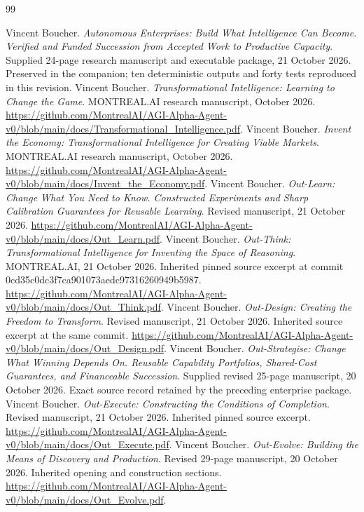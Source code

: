 \documentclass[11pt,letterpaper]{article}
\theoremstyle{definition}\newtheorem{definition}[theorem]{Definition}
\theoremstyle{remark}\newtheorem{remark}[theorem]{Remark}
\begin{document}
\begin{thebibliography}{99}
\small\raggedright\setlength{\itemsep}{.22em}
 Vincent Boucher. \emph{Autonomous Enterprises: Build What Intelligence Can Become. Verified and Funded Succession from Accepted Work to Productive Capacity}. Supplied 24-page research manuscript and executable package, 21 October 2026. Preserved in the companion; ten deterministic outputs and forty tests reproduced in this revision.
 Vincent Boucher. \emph{Transformational Intelligence: Learning to Change the Game}. MONTREAL.AI research manuscript, October 2026. \url{https://github.com/MontrealAI/AGI-Alpha-Agent-v0/blob/main/docs/Transformational_Intelligence.pdf}.
 Vincent Boucher. \emph{Invent the Economy: Transformational Intelligence for Creating Viable Markets}. MONTREAL.AI research manuscript, October 2026. \url{https://github.com/MontrealAI/AGI-Alpha-Agent-v0/blob/main/docs/Invent_the_Economy.pdf}.
 Vincent Boucher. \emph{Out-Learn: Change What You Need to Know. Constructed Experiments and Sharp Calibration Guarantees for Reusable Learning}. Revised manuscript, 21 October 2026. \url{https://github.com/MontrealAI/AGI-Alpha-Agent-v0/blob/main/docs/Out_Learn.pdf}.
 Vincent Boucher. \emph{Out-Think: Transformational Intelligence for Inventing the Space of Reasoning}. MONTREAL.AI, 21 October 2026. Inherited pinned source excerpt at commit 0cd35c0dc3f7ca901073aedc97316260949b5987. \url{https://github.com/MontrealAI/AGI-Alpha-Agent-v0/blob/main/docs/Out_Think.pdf}.
 Vincent Boucher. \emph{Out-Design: Creating the Freedom to Transform}. Revised manuscript, 21 October 2026. Inherited source excerpt at the same commit. \url{https://github.com/MontrealAI/AGI-Alpha-Agent-v0/blob/main/docs/Out_Design.pdf}.
 Vincent Boucher. \emph{Out-Strategise: Change What Winning Depends On. Reusable Capability Portfolios, Shared-Cost Guarantees, and Financeable Succession}. Supplied revised 25-page manuscript, 20 October 2026. Exact source record retained by the preceding enterprise package.
 Vincent Boucher. \emph{Out-Execute: Constructing the Conditions of Completion}. Revised manuscript, 21 October 2026. Inherited pinned source excerpt. \url{https://github.com/MontrealAI/AGI-Alpha-Agent-v0/blob/main/docs/Out_Execute.pdf}.
 Vincent Boucher. \emph{Out-Evolve: Building the Means of Discovery and Production}. Revised 29-page manuscript, 20 October 2026. Inherited opening and construction sections. \url{https://github.com/MontrealAI/AGI-Alpha-Agent-v0/blob/main/docs/Out_Evolve.pdf}.

\end{thebibliography}
\end{document}
